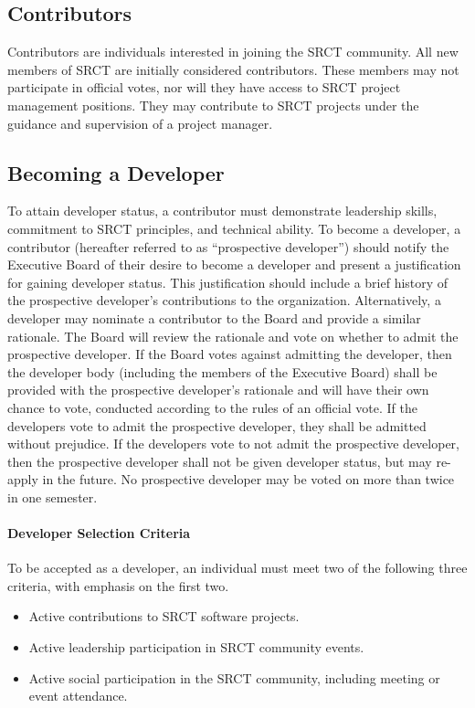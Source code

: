 \documentclass{article}
\begin{document}
  \subsection{Contributors}
  Contributors are individuals interested in joining the SRCT community. 
  All new members of SRCT are initially considered contributors. These 
  members may not participate in official votes, nor will they have 
  access to SRCT project management positions. They may contribute to 
  SRCT projects under the guidance and supervision of a project 
  manager.
  \subsection{Becoming a Developer}
  To attain developer status, a contributor must demonstrate leadership skills,
  commitment to SRCT principles, and technical ability. To become a developer,
  a contributor (hereafter referred to as ``prospective developer'') should
  notify the Executive Board of their desire to become a developer and present
  a justification for gaining developer status. This justification should
  include a brief history of the prospective developer's contributions to the
  organization. Alternatively, a developer may nominate a contributor to the
  Board and provide a similar rationale. The Board will review the rationale
  and vote on whether to admit the prospective developer. If the Board votes
  against admitting the developer, then the developer body (including the
  members of the Executive Board) shall be provided with the prospective
  developer's rationale and will have their own chance to vote, conducted
  according to the rules of an official vote. If the developers vote to
  admit the prospective developer, they shall be admitted without prejudice.
  If the developers vote to not admit the prospective developer, then the
  prospective developer shall not be given developer status, but may re-apply
  in the future. No prospective developer may be voted on more than twice in
  one semester.

  \paragraph{Developer Selection Criteria}
  To be accepted as a developer, an individual must meet two of the
  following three criteria, with emphasis on the first two.

  \begin{itemize}
    \item Active contributions to SRCT software projects.
    \item Active leadership participation in SRCT community events.
    \item Active social participation in the SRCT community, including
    meeting or event attendance.
  \end{itemize}
  
\end{document}

